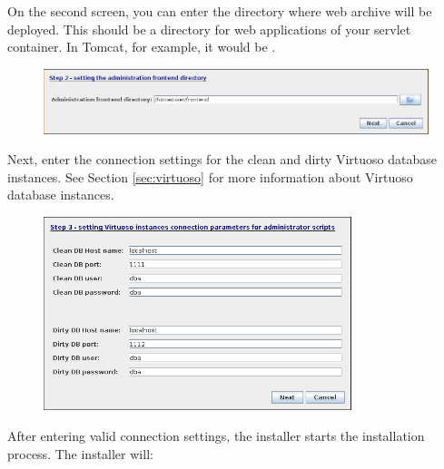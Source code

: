 On the second screen, you can enter the directory where \FE web archive will be deployed. This should be a directory for web applications of your servlet container. In Tomcat, for example, it would be .

\begin{figure}[!h]
    \centering
    \includegraphics[width=\textwidth]{images/install-step-02.png}
\end{figure}

\FloatBarrier

Next, enter the connection settings for the clean and dirty Virtuoso database instances. See Section \ref{sec:virtuoso} for more information about Virtuoso database instances.

\begin{figure}[!h]
    \centering
    \includegraphics[width=0.8\textwidth]{images/install-step-03.png}
\end{figure}

\FloatBarrier

After entering valid connection settings, the installer starts the installation process. The installer will:

